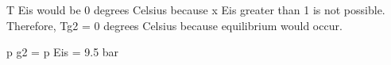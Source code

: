 T Eis would be 0 degrees Celsius because x Eis greater than 1 is not possible. Therefore, Tg2 = 0 degrees Celsius because equilibrium would occur.  

p g2 = p Eis = 9.5 bar